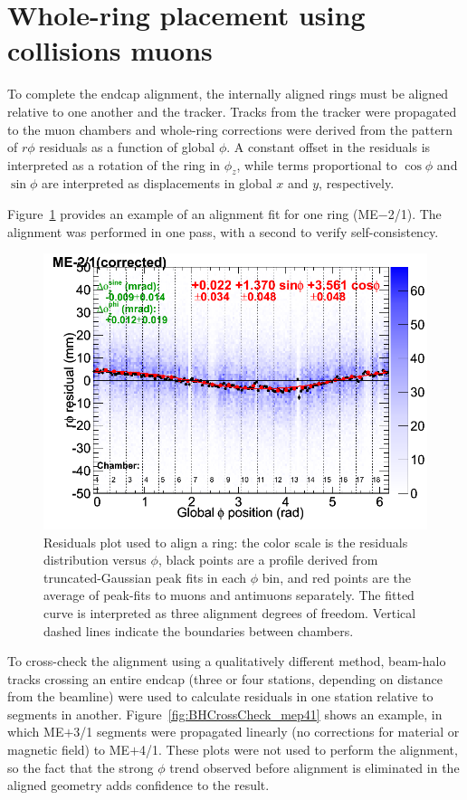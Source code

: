 \documentclass[12pt]{article}
\begin{document}
\section{Whole-ring placement using collisions muons}

To complete the endcap alignment, the internally aligned rings must be
aligned relative to one another and the tracker.  Tracks from the
tracker were propagated to the muon chambers and whole-ring
corrections were derived from the pattern of $r\phi$ residuals as a
function of global $\phi$.  A constant offset in the residuals is
interpreted as a rotation of the ring in $\phi_z$, while terms
proportional to $\cos\phi$ and $\sin\phi$ are interpreted as
displacements in global $x$ and $y$, respectively.

Figure~\ref{fig:one_and_only_mapplot} provides an example of an
alignment fit for one ring (ME$-$2/1).  The alignment was performed in
one pass, with a second to verify self-consistency.

\begin{figure}
\begin{center}
\includegraphics[width=0.5\linewidth]{one_and_only_mapplot.png}
\end{center}

\caption{Residuals plot used to align a ring: the color scale is the
  residuals distribution versus $\phi$, black points are a profile
  derived from truncated-Gaussian peak fits in each $\phi$ bin, and
  red points are the average of peak-fits to muons and antimuons
  separately.  The fitted curve is interpreted as three alignment
  degrees of freedom.  Vertical dashed lines indicate the boundaries
  between chambers. \label{fig:one_and_only_mapplot}}
\end{figure}

To cross-check the alignment using a qualitatively different method,
beam-halo tracks crossing an entire endcap (three or four stations,
depending on distance from the beamline) were used to calculate
residuals in one station relative to segments in another.
Figure~\ref{fig:BHCrossCheck_mep41} shows an example, in which
ME$+$3/1 segments were propagated linearly (no corrections for
material or magnetic field) to ME$+$4/1.  These plots were not used to
perform the alignment, so the fact that the strong $\phi$ trend
observed before alignment is eliminated in the aligned geometry adds
confidence to the result.
\end{document}
